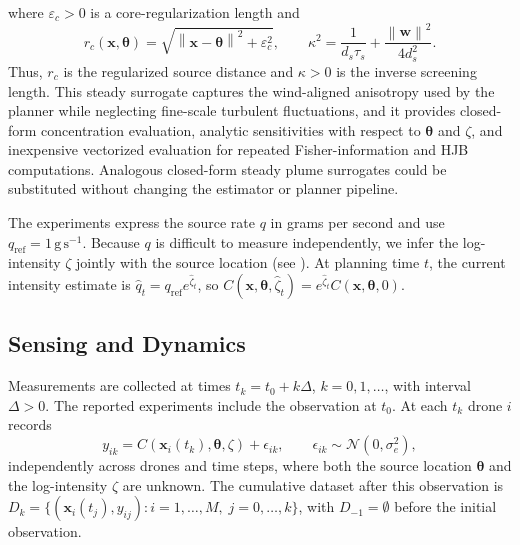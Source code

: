 \documentclass{article}
\newcommand{\norm}[1]{\left\|#1\right\|}
\newcommand{\bs}[1]{\boldsymbol{#1}}
\newcommand{\x}{\mathbf{x}}
\begin{document}
where $\varepsilon_c>0$ is a core-regularization length and
\begin{equation}
r_c(\x,\bs\theta)=\sqrt{\norm{\x-\bs\theta}^2+\varepsilon_c^2},
\qquad
\kappa^2=\frac{1}{d_s\tau_s}+\frac{\norm{\bs w}^2}{4d_s^2}.
\end{equation}
Thus, $r_c$ is the regularized source distance and $\kappa>0$ is the inverse screening length.
This steady surrogate captures the wind-aligned anisotropy used by the planner while neglecting fine-scale turbulent fluctuations, and it provides closed-form concentration evaluation, analytic sensitivities with respect to $\bs\theta$ and $\zeta$, and inexpensive vectorized evaluation for repeated Fisher-information and HJB computations.
Analogous closed-form steady plume surrogates could be substituted without changing the estimator or planner pipeline.

The experiments express the source rate $q$ in grams per second and use $q_{\mathrm{ref}}=1\,\mathrm{g\,s^{-1}}$.
Because $q$ is difficult to measure independently, we infer the log-intensity $\zeta$ jointly with the source location (see ).
At planning time $t$, the current intensity estimate is $\hat q_t=q_{\mathrm{ref}}e^{\hat\zeta_t}$, so $C(\x,\bs\theta,\hat\zeta_t)=e^{\hat\zeta_t} C(\x,\bs\theta,0)$.

\subsection{Sensing and Dynamics}
\label{sec:sensing_dynamics}
Measurements are collected at times $t_k=t_0+k\Delta$, $k=0,1,\ldots$, with interval $\Delta>0$.
The reported experiments include the observation at $t_0$.
At each $t_k$ drone $i$ records
\begin{equation}
\label{eq:measurement_model}
y_{ik}=C\!\left(\x_i(t_k),\bs\theta,\zeta\right)+\epsilon_{ik},\qquad
\epsilon_{ik}\sim\mathcal N(0,\sigma_e^2),
\end{equation}
independently across drones and time steps, where both the source location $\bs\theta$ and the log-intensity $\zeta$ are unknown.
The cumulative dataset after this observation is $D_k=\{(\x_i(t_j),y_{ij}) : i=1,\ldots,M,\; j=0,\ldots,k\}$, with $D_{-1}=\emptyset$ before the initial observation.
\end{document}
